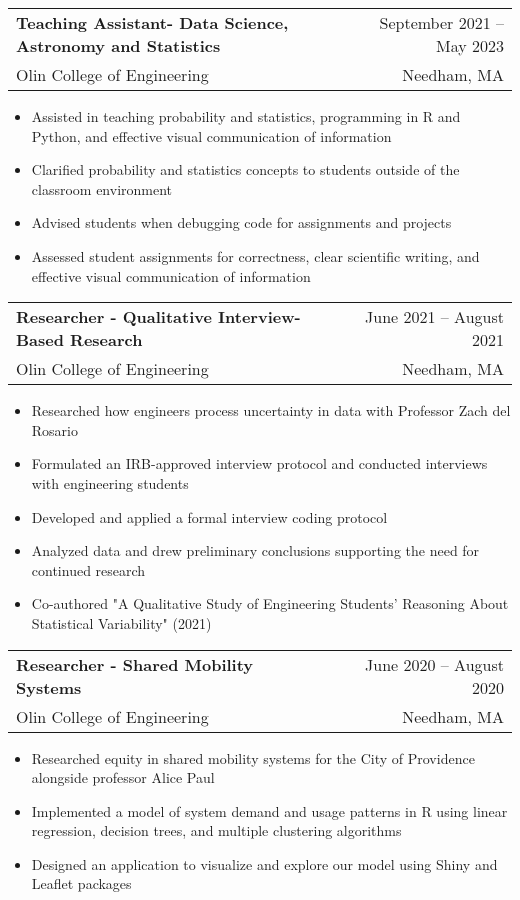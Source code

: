 \documentclass[a4paper,10pt]{article}
\makeatletter
\newcommand{\resumeItem}[1]{
  \item\small{
    {#1\vspace{-2pt}}
  }
}
\newcommand{\resumeSubheading}[4]{
  \vspace{-2pt}\item
    \begin{tabular*}{0.97\textwidth}[t]{l@{\extracolsep{\fill}}r}
      \textbf{#1} & #2 \\
      \small#3 & \small #4 \\
    \end{tabular*}\vspace{-7pt}
}
\newcommand{\resumeItemListStart}{\begin{itemize}}
\newcommand{\resumeItemListEnd}{\end{itemize}\vspace{-5pt}}
\makeatother
\begin{document}
    \resumeSubheading
      {Teaching Assistant- Data Science, Astronomy and Statistics}{September 2021 -- May 2023}
      {Olin College of Engineering}{Needham, MA}
      \resumeItemListStart
        \resumeItem{Assisted in teaching probability and statistics, programming in R and Python, and effective visual communication of information}
        \resumeItem{Clarified probability and statistics concepts to students outside of the classroom environment}
        \resumeItem{Advised students when debugging code for assignments and projects}
        \resumeItem{Assessed student assignments for correctness, clear scientific writing, and effective visual communication of information}
    \resumeItemListEnd

    \resumeSubheading
      {Researcher - Qualitative Interview-Based Research}{June 2021 -- August 2021}
      {Olin College of Engineering}{Needham, MA}
      \resumeItemListStart
        \resumeItem{Researched how engineers process uncertainty in data with Professor Zach del Rosario}
        \resumeItem{Formulated an IRB-approved interview protocol and conducted interviews with engineering students}
        \resumeItem{Developed and applied a formal interview coding protocol}
        \resumeItem{Analyzed data and drew preliminary conclusions supporting the need for continued research}
        \resumeItem{Co-authored "A Qualitative Study of Engineering Students’ Reasoning About Statistical Variability" (2021)}
    \resumeItemListEnd

    \resumeSubheading
      {Researcher - Shared Mobility Systems}{June 2020 -- August 2020}
      {Olin College of Engineering}{Needham, MA}
      \resumeItemListStart
        \resumeItem{Researched equity in shared mobility systems for the City of Providence alongside professor Alice Paul}
        \resumeItem{Implemented a model of system demand and usage patterns in R using linear regression, decision trees, and multiple clustering algorithms}
        \resumeItem{Designed an application to visualize and explore our model using Shiny and Leaflet packages}
    \resumeItemListEnd
\end{document}
